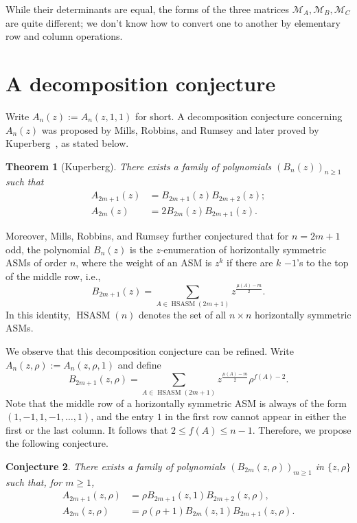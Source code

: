 \documentclass[12pt, a4paper]{amsart} %
\numberwithin{equation}{section}
\newtheorem{theorem}{Theorem}[section]
\newtheorem{conjecture}[theorem]{Conjecture}
\DeclareMathOperator{\HSASM}{HSASM}
\begin{document}
While their determinants are equal,  the forms of the three matrices 
$\mathcal{M}_A, \mathcal{M}_B, \mathcal{M}_C$ are quite different; 
we don't know how to convert one to another by elementary row and column operations.



\section{A decomposition conjecture}\label{sec:conj} %
Write $A_n(z):=A_n(z,1,1)$ for short.
A decomposition conjecture concerning $A_n(z)$ was proposed by Mills, Robbins, and Rumsey \cite{MRR2} and later proved by Kuperberg~\cite{Ku96, Ku02}, as stated below.

\begin{theorem}[Kuperberg]\label{th:decomp}
	There exists a family of polynomials $(B_n(z))_{n\geq 1}$ such that 
    \begin{align*}
        A_{2m+1}(z)&=B_{2m+1}(z)B_{2m+2}(z); \\
        A_{2m}(z)&=2B_{2m}(z)B_{2m+1}(z). 
    \end{align*}
\end{theorem}
Moreover, Mills, Robbins, and Rumsey further conjectured that for $n=2m+1$ odd, 
the polynomial $B_n(z)$ is the $z$-enumeration of horizontally symmetric ASMs of order $n$, 
where the weight of an ASM is $z^k$ if there are $k$ $-1$'s to the top of the middle row, 
i.e.,
$$
B_{2m+1}(z) = \sum_{A \in \HSASM(2m+1)}z^{\frac{\mu(A)- m}{2}}.
$$
In this identity, $\HSASM(n)$ denotes the set of all $n\times n$ horizontally symmetric ASMs.

We observe that this decomposition conjecture can be refined. Write $A_n(z,\rho):=A_n(z,\rho,1)$ and 
define
$$
B_{2m+1}(z,\rho) = \sum_{A \in \HSASM(2m+1)}z^{\frac{\mu(A)- {m}}{2}} \rho^{f(A)-2}.
$$
Note that the middle row of a horizontally symmetric ASM is always of the form $(1,-1,1,-1,\dots,1)$, and the entry $1$ in the first row cannot appear in either the first or the last column. It follows that $2 \leq f(A) \leq n-1$.
Therefore, we propose the following conjecture.

\begin{conjecture}
	There exists a family of polynomials $(B_{2m}(z,\rho))_{m\geq 1}$ in $\{z,\rho\}$ such that,
	for $m\geq 1$,
    \begin{align*}
			 A_{2m+1}(z,\rho)&=\rho B_{2m+1}(z,1)B_{2m+2}(z,\rho),\\
			  A_{2m}(z,\rho)&=\rho(\rho+1)B_{2m}(z,1)B_{2m+1}(z,\rho).
    \end{align*}
\end{conjecture}
\end{document}
